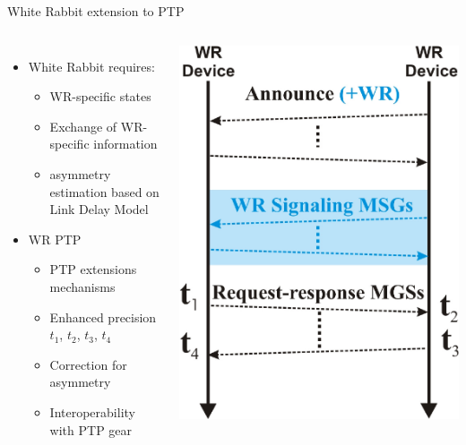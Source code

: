 \documentclass[compress,red]{beamer}
\begin{document}
\begin{frame}{White Rabbit extension to PTP}

\begin{columns}[c]
    \begin{itemize}
	\item White Rabbit requires:
	  \begin{itemize}
	    \item WR-specific states
	    \item Exchange of WR-specific information
      \item asymmetry estimation based on Link Delay Model
	  \end{itemize}
	\item WR PTP
	  \begin{itemize}
	    \item PTP extensions mechanisms
	    \item Enhanced precision $t_1$, $t_2$, $t_3$, $t_4$
	    \item Correction for asymmetry
	    \item Interoperability with PTP gear
	  \end{itemize}
  \end{itemize}
	\begin{center}
	\includegraphics[width=1.1\textwidth]{protocol/wr-ptp-exchange.pdf}
	\end{center}
\end{columns}

\end{frame}
\end{document}
